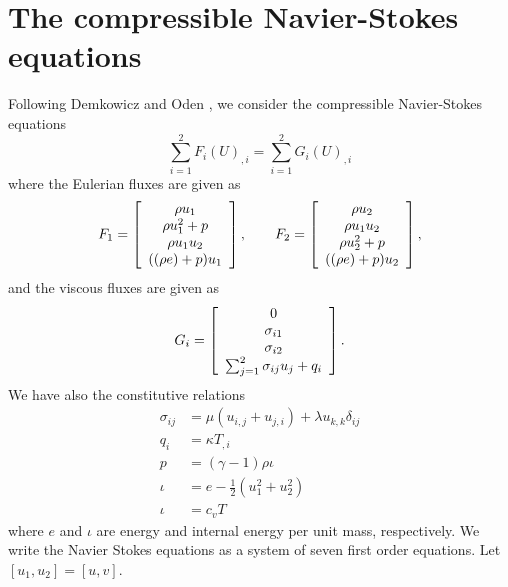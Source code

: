 \section{The compressible Navier-Stokes equations}

Following Demkowicz and Oden \cite{Demkowicz:1990:NFE:112271.112276}, we consider the compressible Navier-Stokes equations
\[
\sum^2_{i=1} F_i\left( U\right)_{,i}=\sum^2_{i=1} G_i\left( U\right)_{,i}
\]
where the Eulerian fluxes are given as
\[
F_1 = \vectfour{\rho u_1}{\rho u_1^2+p}{\rho u_1 u_2}{((\rho e)+p)u_1}, \qquad F_2 = \vectfour{\rho u_2}{\rho u_1 u_2}{\rho u_2^2+p}{((\rho e)+p)u_2},
\]
and the viscous fluxes are given as
\[
G_i = \vectfour{0}{\sigma_{i1}}{\sigma_{i2}}{\sum_{j=1}^2\sigma_{ij}u_j + q_i}.
\]
We have also the constitutive relations 
\begin{align*}
\sigma_{ij} &= \mu(u_{i,j}+u_{j,i}) + \lambda u_{k,k}\delta_{ij}\\
q_i &= \kappa T_{,i}\\
p &= (\gamma-1)\rho\iota\\
\iota &= e-\frac{1}{2}(u_1^2+u_2^2)\\
\iota &= c_vT
\end{align*}
where $e$ and $\iota$ are energy and internal energy per unit mass, respectively. We write the Navier Stokes equations as a system of seven first order equations. Let $[u_1,u_2] = [u,v]$. 

